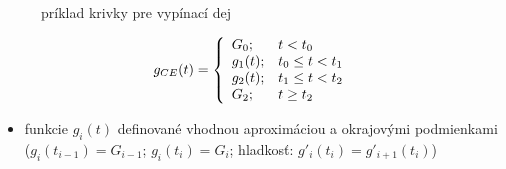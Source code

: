 \documentclass[oneside]{article}
\begin{document}
\begin{figure}[ht!]
	\centering
	
	\caption{príklad krivky pre vypínací dej}
	\label{fig:krivka_vyp_t012}
\end{figure}

\begin{equation}
	g_{CE}(t) = 
	\left\{
	\begin{array}{l l}
		G_0;	& t<t_0 \\
		g_1(t);	& t_0 \leq t < t_1 \\
		g_2(t);	& t_1 \leq t < t_2 \\
		G_2;		& t \geq t_2
	\end{array}
	\right.
\end{equation}

\begin{itemize}
    \item funkcie $g_i(t)$ definované vhodnou aproximáciou a okrajovými podmienkami ($g_i(t_{i-1}) = G_{i-1}$; $g_i(t_i) = G_i$; hladkosť: $g'_i(t_i) = g'_{i+1}(t_i)$)
\end{itemize}
\end{document}
